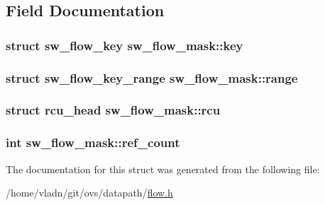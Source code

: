 \subsection{Field Documentation}
\hypertarget{structsw__flow__mask_a52db0284fdd4579a5f30dee0837a7485}{}
\subsubsection[{key}]{\setlength{\rightskip}{0pt plus 5cm}struct {\bf sw\+\_\+flow\+\_\+key} sw\+\_\+flow\+\_\+mask\+::key}\label{structsw__flow__mask_a52db0284fdd4579a5f30dee0837a7485}
\hypertarget{structsw__flow__mask_aa6062c0e580d516ff2d9ce8f9611432b}{}
\subsubsection[{range}]{\setlength{\rightskip}{0pt plus 5cm}struct {\bf sw\+\_\+flow\+\_\+key\+\_\+range} sw\+\_\+flow\+\_\+mask\+::range}\label{structsw__flow__mask_aa6062c0e580d516ff2d9ce8f9611432b}
\hypertarget{structsw__flow__mask_aa5aebb526fafd5f7f70b605970a72fd8}{}
\subsubsection[{rcu}]{\setlength{\rightskip}{0pt plus 5cm}struct rcu\+\_\+head sw\+\_\+flow\+\_\+mask\+::rcu}\label{structsw__flow__mask_aa5aebb526fafd5f7f70b605970a72fd8}
\hypertarget{structsw__flow__mask_ad1bf602183e4fa7dfeab96a7ca06243b}{}
\subsubsection[{ref\+\_\+count}]{\setlength{\rightskip}{0pt plus 5cm}int sw\+\_\+flow\+\_\+mask\+::ref\+\_\+count}\label{structsw__flow__mask_ad1bf602183e4fa7dfeab96a7ca06243b}


The documentation for this struct was generated from the following file\+:\begin{DoxyCompactItemize}
\item 
/home/vladn/git/ovs/datapath/\hyperlink{flow_8h}{flow.\+h}\end{DoxyCompactItemize}
